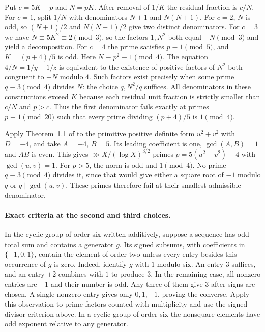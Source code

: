 \documentclass[a4paper,11pt]{article}
\theoremstyle{definition}\newtheorem{question}[theorem]{Question}
\begin{document}
Put $c=5K-p$ and $N=pK$. After removal of $1/K$ the residual fraction
is $c/N$. For $c=1$, split $1/N$ with denominators $N+1$ and $N(N+1)$.
For $c=2$, $N$ is odd, so $(N+1)/2$ and $N(N+1)/2$ give two
distinct denominators. For $c=3$ we have
$N\equiv5K^2\equiv2\pmod3$, so the factors $1,N^2$ both equal
$-N\pmod3$ and yield a decomposition.
For $c=4$ the prime satisfies $p\equiv1\pmod5$, and $K=(p+4)/5$ is odd.
Here $N\equiv p^2\equiv1\pmod4$. The equation $4/N=1/y+1/z$
is equivalent to the existence of positive factors of $N^2$ both
congruent to $-N$ modulo $4$. Such factors exist precisely when some
prime $q\equiv3\pmod4$ divides $N$: the choice $q,N^2/q$ suffices.
All denominators in these constructions exceed $K$ because each
residual unit fraction is strictly smaller than $c/N$ and $p>c$.
Thus the first denominator fails exactly at primes $p\equiv1\pmod{20}$
such that every prime dividing $(p+4)/5$ is $1\pmod4$.

Apply Theorem~1.1 of \cite{fhrss} to the primitive positive definite
form $u^2+v^2$ with $D=-4$, and take $A=-4$, $B=5$.
Its leading coefficient is one, $\gcd(A,B)=1$ and $AB$ is even.
This gives $\gg X/(\log X)^{3/2}$ primes $p=5(u^2+v^2)-4$ with
$\gcd(u,v)=1$. For $p>5$, the norm is odd and $1\pmod4$.
No prime $q\equiv3\pmod4$ divides it, since that would give either
a square root of $-1$ modulo $q$ or $q\mid\gcd(u,v)$.
These primes therefore fail at their smallest admissible denominator.

\paragraph{Exact criteria at the second and third choices.}
In the cyclic group of order six written additively, suppose a sequence
has odd total sum and contains a generator $g$. Its signed subsums,
with coefficients in $\{-1,0,1\}$, contain the element of order two
unless every entry besides this occurrence of $g$ is zero.
Indeed, identify $g$ with $1$ modulo six. An entry $3$ suffices, and
an entry $\pm2$ combines with $1$ to produce $3$. In the remaining
case, all nonzero entries are $\pm1$ and their number is odd.
Any three of them give $3$ after signs are chosen. A single nonzero
entry gives only $0,1,-1$, proving the converse. Apply this observation
to prime factors counted with multiplicity and use the signed-divisor
criterion above. In a cyclic group of order six the nonsquare elements
have odd exponent relative to any generator.
\end{document}
